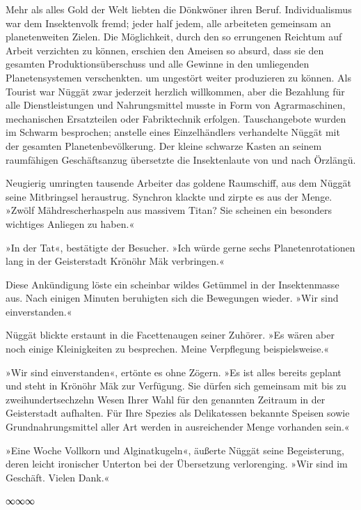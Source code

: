 Mehr als alles Gold der Welt liebten die Dönkwöner ihren Beruf. Individualismus war dem Insektenvolk fremd; jeder half jedem, alle arbeiteten gemeinsam an planetenweiten Zielen. Die Möglichkeit, durch den so errungenen Reichtum auf Arbeit verzichten zu können, erschien den Ameisen so absurd, dass sie den gesamten Produktionsüberschuss und alle Gewinne in den umliegenden Planetensystemen verschenkten. um ungestört weiter produzieren zu können. Als Tourist war Nüggät zwar jederzeit herzlich willkommen, aber die Bezahlung für alle Dienstleistungen und Nahrungsmittel musste in Form von Agrarmaschinen, mechanischen Ersatzteilen oder Fabriktechnik erfolgen. Tauschangebote wurden im Schwarm besprochen; anstelle eines Einzelhändlers verhandelte Nüggät mit der gesamten Planetenbevölkerung. Der kleine schwarze Kasten an seinem raumfähigen Geschäftsanzug übersetzte die Insektenlaute von und nach Örzlängü.

Neugierig umringten tausende Arbeiter das goldene Raumschiff, aus dem Nüggät seine Mitbringsel heraustrug. Synchron klackte und zirpte es aus der Menge. »Zwölf Mähdrescherhaspeln aus massivem Titan? Sie scheinen ein besonders wichtiges Anliegen zu haben.«

»In der Tat«, bestätigte der Besucher. »Ich würde gerne sechs Planetenrotationen lang in der Geisterstadt Krönöhr Mäk verbringen.«

Diese Ankündigung löste ein scheinbar wildes Getümmel in der Insektenmasse aus. Nach einigen Minuten beruhigten sich die Bewegungen wieder. »Wir sind einverstanden.«

Nüggät blickte erstaunt in die Facettenaugen seiner Zuhörer. »Es wären aber noch einige Kleinigkeiten zu besprechen. Meine Verpflegung beispielsweise.«

»Wir sind einverstanden«, ertönte es ohne Zögern. »Es ist alles bereits geplant und steht in Krönöhr Mäk zur Verfügung. Sie dürfen sich gemeinsam mit bis zu zweihundertsechzehn Wesen Ihrer Wahl für den genannten Zeitraum in der Geisterstadt aufhalten. Für Ihre Spezies als Delikatessen bekannte Speisen sowie Grundnahrungsmittel aller Art werden in ausreichender Menge vorhanden sein.«

»Eine Woche Vollkorn und Alginatkugeln«, äußerte Nüggät seine Begeisterung, deren leicht ironischer Unterton bei der Übersetzung verlorenging. »Wir sind im Geschäft. Vielen Dank.«

\begin{center}
∞∞∞
\end{center}

